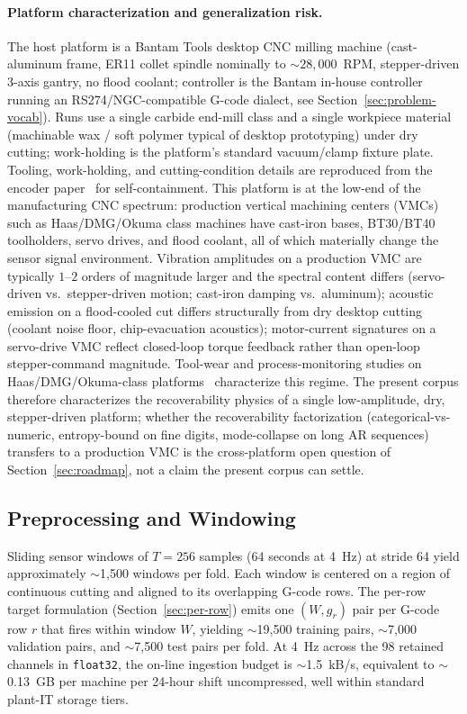 \documentclass[sensors,article,submit,moreauthors,pdftex]{Definitions/mdpi}
\begin{document}
\paragraph{Platform characterization and generalization risk.} The host platform is a Bantam Tools desktop CNC milling machine (cast-aluminum frame, ER11 collet spindle nominally to $\sim 28{,}000$~RPM, stepper-driven 3-axis gantry, no flood coolant; controller is the Bantam in-house controller running an RS274/NGC-compatible G-code dialect, see Section~\ref{sec:problem-vocab}). Runs use a single carbide end-mill class and a single workpiece material (machinable wax / soft polymer typical of desktop prototyping) under dry cutting; work-holding is the platform's standard vacuum/clamp fixture plate. Tooling, work-holding, and cutting-condition details are reproduced from the encoder paper~\cite{encoder_paper} for self-containment. This platform is at the low-end of the manufacturing CNC spectrum: production vertical machining centers (VMCs) such as Haas/DMG/Okuma class machines have cast-iron bases, BT30/BT40 toolholders, servo drives, and flood coolant, all of which materially change the sensor signal environment. Vibration amplitudes on a production VMC are typically $1$--$2$ orders of magnitude larger and the spectral content differs (servo-driven vs.\ stepper-driven motion; cast-iron damping vs.\ aluminum); acoustic emission on a flood-cooled cut differs structurally from dry desktop cutting (coolant noise floor, chip-evacuation acoustics); motor-current signatures on a servo-drive VMC reflect closed-loop torque feedback rather than open-loop stepper-command magnitude. Tool-wear and process-monitoring studies on Haas/DMG/Okuma-class platforms~\cite{teti2010advanced,wang2018deep,serin2020tool} characterize this regime. The present corpus therefore characterizes the recoverability physics of a single low-amplitude, dry, stepper-driven platform; whether the recoverability factorization (categorical-vs-numeric, entropy-bound on fine digits, mode-collapse on long AR sequences) transfers to a production VMC is the cross-platform open question of Section~\ref{sec:roadmap}, not a claim the present corpus can settle.

\subsection{Preprocessing and Windowing}
\label{sec:preprocessing}

Sliding sensor windows of $T=256$ samples (64 seconds at 4~Hz) at stride 64 yield approximately $\sim$1{,}500 windows per fold. Each window is centered on a region of continuous cutting and aligned to its overlapping G-code rows. The per-row target formulation (Section~\ref{sec:per-row}) emits one $(W, g_r)$ pair per G-code row $r$ that fires within window $W$, yielding $\sim$19{,}500 training pairs, $\sim$7{,}000 validation pairs, and $\sim$7{,}500 test pairs per fold. At 4~Hz across the 98 retained channels in \texttt{float32}, the on-line ingestion budget is $\sim$1.5~kB/s, equivalent to $\sim$0.13~GB per machine per 24-hour shift uncompressed, well within standard plant-IT storage tiers.
\end{document}
